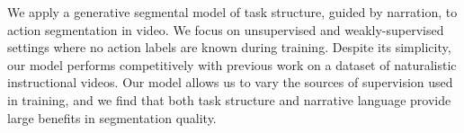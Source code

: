 We apply a generative segmental model of task structure, guided by narration, to action segmentation in video.  We focus on unsupervised and weakly-supervised settings where no action labels are known during training.  Despite its simplicity, our model performs competitively with previous work on a dataset of naturalistic instructional videos. Our model allows us to vary the sources of supervision used in training, and we find that both task structure and narrative language provide large benefits in segmentation quality.
